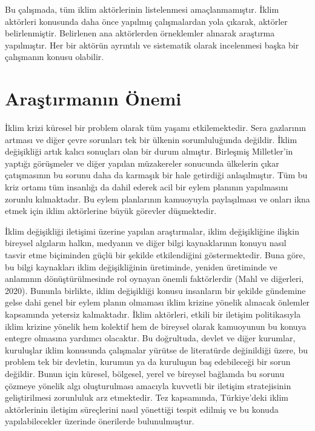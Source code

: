\documentclass[
]{book}
\begin{document}
Bu çalışmada, tüm iklim aktörlerinin listelenmesi amaçlanmamıştır. İklim aktörleri konusunda daha önce yapılmış çalışmalardan \citep{ozer2017iklim, ozmen2011cevre, sahin2019turkiye} yola çıkarak, aktörler belirlenmiştir. Belirlenen ana aktörlerden örneklemler alınarak araştırma yapılmıştır. Her bir aktörün ayrıntılı ve sistematik olarak incelenmesi başka bir çalışmanın konusu olabilir.

\hypertarget{araux15ftux131rmanux131n-uxf6nemi}{%
\section{Araştırmanın Önemi}\label{araux15ftux131rmanux131n-uxf6nemi}}

İklim krizi küresel bir problem olarak tüm yaşamı etkilemektedir. Sera gazlarının artması ve diğer çevre sorunları tek bir ülkenin sorumluluğunda değildir. İklim değişikliği artık kalıcı sonuçları olan bir durum almıştır. Birleşmiş Milletler'in yaptığı görüşmeler ve diğer yapılan müzakereler sonucunda ülkelerin çıkar çatışmasının bu sorunu daha da karmaşık bir hale getirdiği anlaşılmıştır. \citep{ozer2017iklim} Tüm bu kriz ortamı tüm insanlığı da dahil ederek acil bir eylem planının yapılmasını zorunlu kılmaktadır. Bu eylem planlarının kamuoyuyla paylaşılması ve onları ikna etmek için iklim aktörlerine büyük görevler düşmektedir.

İklim değişikliği iletişimi üzerine yapılan araştırmalar, iklim değişikliğine ilişkin bireysel algıların halkın, medyanın ve diğer bilgi kaynaklarının konuyu nasıl tasvir etme biçiminden güçlü bir şekilde etkilendiğini göstermektedir. Buna göre, bu bilgi kaynakları iklim değişikliğinin üretiminde, yeniden üretiminde ve anlamının dönüştürülmesinde rol oynayan önemli faktörlerdir (Mahl ve diğerleri, 2020).
Bununla birlikte, iklim değişikliği konusu insanların bir şekilde gündemine gelse dahi genel bir eylem planın olmaması iklim krizine yönelik alınacak önlemler kapsamında yetersiz kalmaktadır. İklim aktörleri, etkili bir iletişim politikasıyla iklim krizine yönelik hem kolektif hem de bireysel olarak kamuoyunun bu konuya entegre olmasına yardımcı olacaktır. Bu doğrultuda, devlet ve diğer kurumlar, kuruluşlar iklim konusunda çalışmalar yürütse de literatürde değinildiği üzere, bu problem tek bir devletin, kurumun ya da kuruluşun baş edebileceği bir sorun değildir. Bunun için küresel, bölgesel, yerel ve bireysel bağlamda bu sorunu çözmeye yönelik algı oluşturulması amacıyla kuvvetli bir iletişim stratejisinin geliştirilmesi zorunluluk arz etmektedir. Tez kapsamında, Türkiye'deki iklim aktörlerinin iletişim süreçlerini nasıl yönettiği tespit edilmiş ve bu konuda yapılabilecekler üzerinde önerilerde bulunulmuştur.
\end{document}
